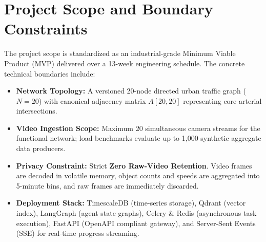 \section{Project Scope and Boundary Constraints}
The project scope is standardized as an industrial-grade Minimum Viable Product (MVP) delivered over a 13-week engineering schedule. The concrete technical boundaries include:
\begin{itemize}[leftmargin=1.5cm, label=--]
  \item \textbf{Network Topology:} A versioned 20-node directed urban traffic graph ($N=20$) with canonical adjacency matrix $A[20,20]$ representing core arterial intersections.
  \item \textbf{Video Ingestion Scope:} Maximum 20 simultaneous camera streams for the functional network; load benchmarks evaluate up to 1,000 synthetic aggregate data producers.
  \item \textbf{Privacy Constraint:} Strict \textbf{Zero Raw-Video Retention}. Video frames are decoded in volatile memory, object counts and speeds are aggregated into 5-minute bins, and raw frames are immediately discarded.
  \item \textbf{Deployment Stack:} TimescaleDB (time-series storage), Qdrant (vector index), LangGraph (agent state graphs), Celery \& Redis (asynchronous task execution), FastAPI (OpenAPI compliant gateway), and Server-Sent Events (SSE) for real-time progress streaming.
\end{itemize}

